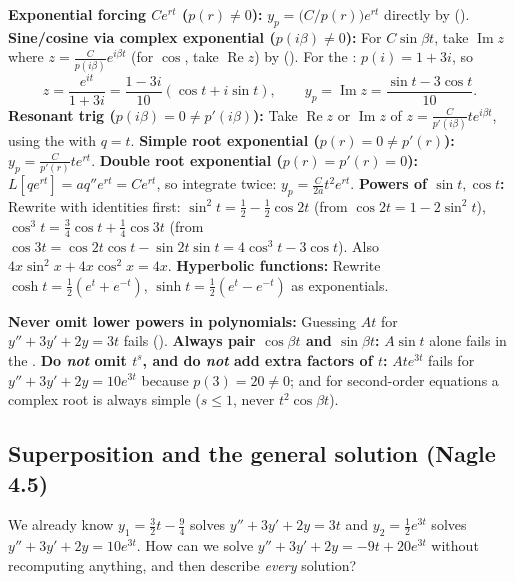 \documentclass[10pt]{scrartcl}
\begin{document}
\begin{shortcuts}
  \ii \textbf{Exponential forcing $Ce^{rt}$ ($p(r)\neq 0$):} $y_p=\bigl(C/p(r)\bigr)e^{rt}$ directly by ().
  \ii \textbf{Sine/cosine via complex exponential ($p(i\beta)\neq 0$):} For $C\sin\beta t$, take $\operatorname{Im}z$ where $z=\frac{C}{p(i\beta)}e^{i\beta t}$ (for $\cos$, take $\operatorname{Re}z$) by (). For the : $p(i)=1+3i$, so
  \[
    z=\frac{e^{it}}{1+3i}=\frac{1-3i}{10}(\cos t+i\sin t),\qquad y_p=\operatorname{Im}z=\frac{\sin t-3\cos t}{10}.
  \]
  \ii \textbf{Resonant trig ($p(i\beta)=0\neq p'(i\beta)$):} Take $\operatorname{Re}z$ or $\operatorname{Im}z$ of $z=\frac{C}{p'(i\beta)}te^{i\beta t}$, using the  with $q=t$.
  \ii \textbf{Simple root exponential ($p(r)=0\neq p'(r)$):} $y_p=\frac{C}{p'(r)}te^{rt}$.
  \ii \textbf{Double root exponential ($p(r)=p'(r)=0$):} $L[qe^{rt}]=aq''e^{rt}=Ce^{rt}$, so integrate twice: $y_p=\frac{C}{2a}t^2e^{rt}$.
  \ii \textbf{Powers of $\sin t, \cos t$:} Rewrite with identities first: $\sin^2 t=\frac12-\frac12\cos 2t$ (from $\cos 2t=1-2\sin^2t$), $\cos^3 t=\frac34\cos t+\frac14\cos 3t$ (from $\cos 3t=\cos 2t\cos t-\sin 2t\sin t=4\cos^3t-3\cos t$). Also $4x\sin^2 x+4x\cos^2 x=4x$.
  \ii \textbf{Hyperbolic functions:} Rewrite $\cosh t=\frac12(e^t+e^{-t})$, $\sinh t=\frac12(e^t-e^{-t})$ as exponentials.
\end{shortcuts}

\begin{trapbox}
  \ii \textbf{Never omit lower powers in polynomials:} Guessing $At$ for $y''+3y'+2y=3t$ fails ().
  \ii \textbf{Always pair $\cos\beta t$ and $\sin\beta t$:} $A\sin t$ alone fails in the .
  \ii \textbf{Do \emph{not} omit $t^s$, and do \emph{not} add extra factors of $t$:} $Ate^{3t}$ fails for $y''+3y'+2y=10e^{3t}$ because $p(3)=20\neq 0$; and for second-order equations a complex root is always simple ($s\le 1$, never $t^2\cos\beta t$).
\end{trapbox}

\subsection{Superposition and the general solution (Nagle 4.5)}
\begin{qbox}
  We already know $y_1=\frac32 t-\frac94$ solves $y''+3y'+2y=3t$ and $y_2=\frac12 e^{3t}$ solves $y''+3y'+2y=10e^{3t}$. How can we solve $y''+3y'+2y=-9t+20e^{3t}$ without recomputing anything, and then describe \emph{every} solution?
\end{qbox}
\end{document}
